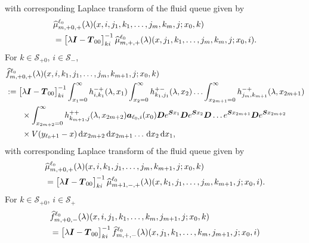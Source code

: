 with corresponding Laplace transform of the fluid queue given by 
\begin{align}
	&\widehat \mu_{m,+0,+}^{\ell_0}(\lambda)(x,i,j_1,k_1,\dots,j_m,k_m,j;x_0,k) \nonumber 
	\\&= \begin{bmatrix} \lambda \boldsymbol I - \boldsymbol T_{00} \end{bmatrix}^{-1}_{ki}\widehat \mu_{m,+,+}^{\ell_0}(\lambda)(x,j_1,k_1,\dots,j_m,k_m,j;x_0,i).
\end{align}
For \(k\in\mathcal S_{+0}\), \(i\in\mathcal S_-\),
\begin{align}
	&\widehat{f}_{m,+0,+}^{\ell_0}(\lambda)(x,i,k_1,j_1,\dots,j_m,k_{m+1},j;x_0,k)\nonumber 
	\\&:=\begin{bmatrix} \lambda \boldsymbol I - \boldsymbol T_{00} \end{bmatrix}^{-1}_{ki}\int_{x_1=0}^\infty h^{-+}_{i,k_{1}}(\lambda,x_1)\nonumber
	\int_{x_2=0}^\infty h^{+-}_{k_1,j_1}(\lambda,x_2)
	\hdots \int_{x_{2m+1}=0}^\infty h^{-+}_{j_{m},k_{m+1}}(\lambda, x_{2m+1}) 
	\\&\qquad \times\int_{x_{2m+2}=0}^\infty h^{++}_{k_{m+1},j}(\lambda,x_{2m+2})
	 \boldsymbol   a_{\ell_0,i}(x_0)\boldsymbol De^{\boldsymbol{S}x_1} \boldsymbol{D} e^{\boldsymbol{S}x_2} \boldsymbol{D}\dots e^{\boldsymbol{S}x_{2m+1}}  \boldsymbol{D}e^{\boldsymbol{S}x_{2m+2}} \nonumber 
	 \\&\qquad{}\times V(y_{\ell_0+1}-x)  \, \mathrm{d} x_{2m+2} \, \mathrm{d} x_{2m+1}\dots\, \mathrm{d} x_2 \, \mathrm{d} x_1,\label{eqn: k0jJ0AAAaAA}
\end{align}
with corresponding Laplace transform of the fluid queue given by 
\begin{align}
	&\widehat \mu_{m,+0,+}^{\ell_0}(\lambda)(x,i,k_1,j_1,\dots,j_m,k_{m+1},j;x_0,k) \nonumber 
	\\&= \begin{bmatrix} \lambda \boldsymbol I - \boldsymbol T_{00} \end{bmatrix}^{-1}_{ki}\widehat \mu_{m+1,-,+}^{\ell_0}(\lambda)(x,k_1,j_1,\dots,j_m,k_{m+1},j;x_0,i).
\end{align}
For \(k\in\mathcal S_{+0}\), \(i\in\mathcal S_+\)
\begin{align}
		&\widehat{f}_{m,+0,-}^{\ell_0}(\lambda)(x,i,j_1,k_1,\dots,k_m,j_{m+1},j;x_0,k) \nonumber 
		\\&=\vligne{\lambda \bs I - \bs T_{00}}^{-1}_{ki}\widehat{f}_{m,+,-}^{\ell_0}(\lambda)(x,j_1,k_1,\dots,k_m,j_{m+1},j;x_0,i)
		\label{eqn: k0jJ0asfcavv134}%
\end{align} 
